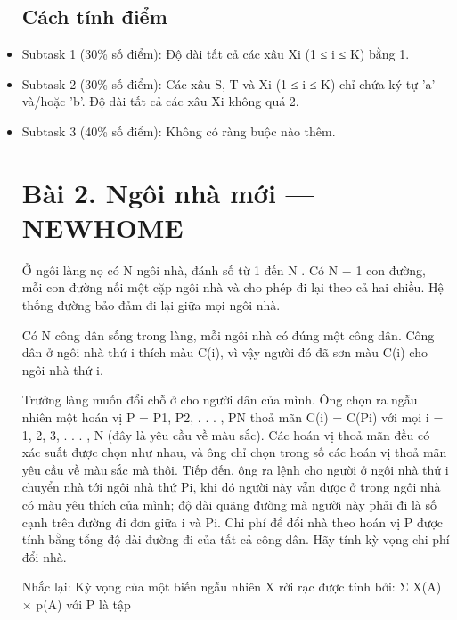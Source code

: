 \begin{itemize}
  \hfill\break

  \subsection{Cách tính điểm}\label{cuxe1ch-tuxednh-ux111iux1ec3m}

  \hfill\break
\item
  {Subtask 1 (30\% số điểm): Độ dài tất cả các xâu }X{i} {(}{1 }{≤ }i {≤
  }K{) bằng }{1}{.}
\item
  {Subtask 2 (30\% số điểm): Các xâu }S{, }T {và }X{i} {(}{1 }{≤ }i {≤
  }K{) chỉ chứa ký tự 'a' và/hoặc 'b'. Độ dài tất cả các xâu }X{i}
  {không quá }{2}{.}
\item
  Subtask 3 (40\% số điểm): Không có ràng buộc nào thêm.

  \section{Bài 2. Ngôi nhà mới ---
  NEWHOME}\label{buxe0i-2.-nguxf4i-nhuxe0-mux1edbi-newhome}

  \hfill\break

  Ở ngôi làng nọ có {N }ngôi nhà, đánh số từ 1 đến {N }. Có {N }{− }{1
  }con đường, mỗi con đường nối một cặp ngôi nhà và cho phép đi lại theo
  cả hai chiều. Hệ thống đường bảo đảm đi lại giữa mọi ngôi nhà.

  {Có }N {công dân sống trong làng, mỗi ngôi nhà có đúng một công dân.
  Công dân ở ngôi nhà thứ }i {thích màu }C{(}i{)}{, vì vậy người đó đã
  sơn màu }C{(}i{) }{cho ngôi nhà thứ }i{.}

  {Trưởng làng muốn đổi chỗ ở cho người dân của mình. Ông chọn ra ngẫu
  nhiên một hoán vị }P {= }P{1}, P{2}, . . . , P{N} {thoả mãn }C{(}i{) =
  }C{(}P{i}{) }{với mọi }i {= 1}, {2}, {3}, . . . , N {(đây là yêu cầu
  về màu sắc). Các hoán vị thoả mãn đều có xác suất được chọn như nhau,
  và ông chỉ chọn trong số các hoán vị thoả mãn yêu cầu về màu sắc mà
  thôi. Tiếp đến, ông ra lệnh cho người ở ngôi nhà thứ }i {chuyển nhà
  tới ngôi nhà thứ }P{i}{, khi đó người này vẫn được ở trong ngôi nhà có
  màu yêu thích của mình; độ dài quãng đường mà người này phải đi là số
  cạnh trên đường đi đơn giữa }i {và }P{i}{. Chi phí để đổi nhà theo
  hoán vị }P {được tính bằng tổng độ dài đường đi của tất cả công dân.
  Hãy tính kỳ vọng chi phí đổi nhà.}

  {Nhắc lại: }{Kỳ vọng của một biến ngẫu nhiên }X {rời rạc được tính
  bởi: }{Σ }X{(}A{) }{× }p{(}A{) }{với }{P }{là tập}


\end{itemize}
